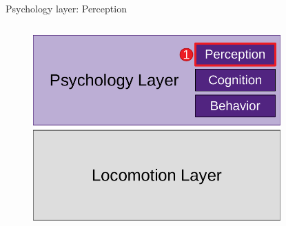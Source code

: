 \documentclass[compress,t,usenames,xcolor=dvipsnames]{beamer}
\begin{document}
\begin{frame}[c]{Psychology layer: Perception}
    
    \begin{columns}
        \begin{column}[c]{0.5\linewidth}
            \begin{figure}
                \centering
                \includegraphics[width=\linewidth]{VaderePsychologyLayer/StepByStep/Vadere-PsychologyLayerDetailed-PerceptionHighlighted}
            \end{figure}
        \end{column}
        \begin{column}[c]{0.5\linewidth}
            \begin{figure}
                \centering

\end{figure}
\end{column}
\end{columns}
\end{frame}
\end{document}
